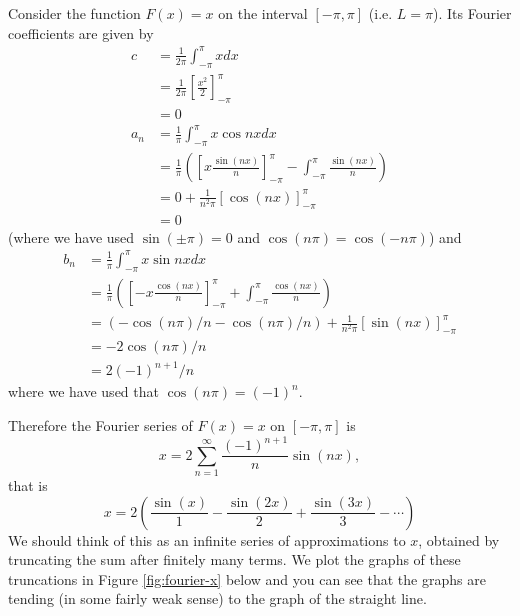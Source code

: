 \begin{exm}\label{exm:fxequalsx}
Consider the function $F(x)=x$ on the interval $[-\pi,\pi]$ (i.e. $L=\pi$). Its Fourier coefficients are given by
\begin{align*}
c&=\frac{1}{2\pi}\int_{-\pi}^{\pi}xdx\\
&=\frac{1}{2\pi}\left[\frac{x^2}{2}\right]_{-\pi}^{\pi}\\
&=0\\
a_n&=\frac{1}{\pi}\int_{-\pi}^{\pi}x\cos nx dx\\
&=\frac{1}{\pi}\left(\left[x\frac{\sin(nx)}{n}\right]_{-\pi}^{\pi}-\int_{-\pi}^{\pi}\frac{\sin(nx)}{n}\right)\\
&=0+\frac{1}{n^2\pi}\left[\cos(nx)\right]_{-\pi}^{\pi}\\
&=0
\end{align*}
(where we have used $\sin(\pm\pi)=0$ and $\cos(n\pi)=\cos(-n\pi)$) and
\begin{align*}
b_n&=\frac{1}{\pi}\int_{-\pi}^{\pi}x\sin nx dx\\
&=\frac{1}{\pi}\left(\left[-x\frac{\cos(nx)}{n}\right]_{-\pi}^{\pi}+\int_{-\pi}^{\pi}\frac{\cos(nx)}{n}\right)\\
&=(-\cos(n\pi)/n-\cos(n\pi)/n)+\frac{1}{n^2\pi}\left[\sin(nx)\right]_{-\pi}^{\pi}\\
&=-2\cos(n\pi)/n\\
&=2(-1)^{n+1}/n
\end{align*}
where we have used that $\cos(n\pi)=(-1)^n$.

Therefore the Fourier series of $F(x)=x$ on $[-\pi,\pi]$ is
\[x=2\sum_{n=1}^{\infty}\frac{(-1)^{n+1}}{n}\sin(nx),\]
that is
\[x=2\left(\frac{\sin(x)}{1}-\frac{\sin(2x)}{2}+\frac{\sin(3x)}{3}-\cdots\right)\]
We should think of this as an infinite series of approximations to $x$, obtained by truncating the sum after finitely many terms. We plot the graphs of these truncations in Figure \ref{fig:fourier-x} below and you can see that the graphs are tending (in some fairly weak sense) to the graph of the straight line.
\end{exm}

